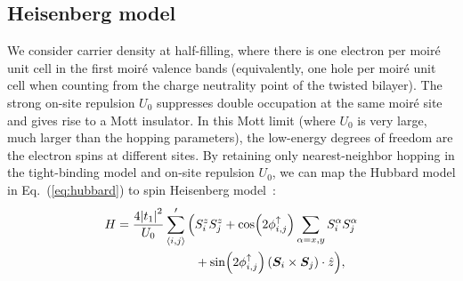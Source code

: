 \documentclass[aps,prx,floatfix,twocolumn]{revtex4-1}
\begin{document}
	\subsection{Heisenberg model}
	We consider carrier density at half-filling, where there is one electron per moir\'e unit cell in the first moir\'e valence bands  (equivalently, one hole per moir\'e unit cell when counting from the charge neutrality point of the twisted bilayer). The strong on-site repulsion $U_0$ suppresses double occupation at the same moir\'e site and gives rise to a Mott insulator. In this Mott limit (where $ U_0 $ is very large, much larger than the hopping parameters), the low-energy degrees of freedom are the electron spins at different sites. By retaining only nearest-neighbor hopping in the tight-binding model and on-site repulsion $U_0$, we can map the Hubbard model in Eq.~(\ref{eq:hubbard}) to spin Heisenberg model~\cite{macdonald1988fractu}:   
	\begin{equation}\label{eq:heisenberg}
		\begin{aligned}
		H= \frac{4\abs{t_1}^2}{U_0}\sum_{\langle i,j \rangle }^{\prime}  \Big( & S_{i}^z S_{j}^z+\cos (2\phi_{i,j}^{\uparrow})\sum_{\alpha=x,y}S_{i}^{\alpha} S_{j}^{\alpha} \\
		& +\sin (2\phi_{i,j}^{\uparrow}) \left(\bm{S}_{i}\times\bm{S}_{j}\right)\cdot \hat{z} \Big),
		\end{aligned}
		\end{equation}
\end{document}
